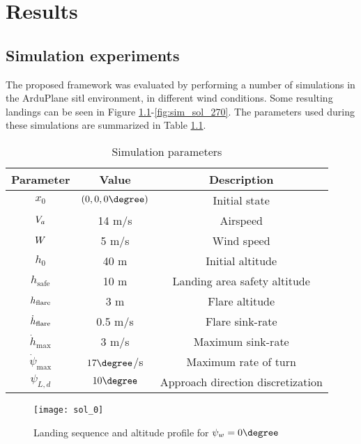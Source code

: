 \chapter{Results}\label{cha:results}
\section{Simulation experiments}
The proposed framework was evaluated by performing a number of simulations in the ArduPlane \ac{sitl} environment, in different wind conditions. 
Some resulting landings can be seen in Figure \ref{fig:sim_sol_0}-\ref{fig:sim_sol_270}. The parameters used during these simulations are summarized in Table \ref{tab:sim_params}.

\begin{table}[H]
    \begin{center}
        \begin{tabular}{|c|c|c|}
            \hline
            \textbf{Parameter} & \textbf{Value} & \textbf{Description}\\
            \hline
            $x_0$ & $(0,0,0\degree)$ & Initial state \\
            \hline
            $V_a$ & 14 m/s & Airspeed \\
            \hline
            $W$ & 5 m/s & Wind speed \\
            \hline
            $h_0$ & 40 m & Initial altitude \\
            \hline
            $h_{\text{safe}}$ & 10 m & Landing area safety altitude \\
            \hline
            $h_{\text{flare}}$ & 3 m & Flare altitude \\
            \hline
            $\dot{h}_{\text{flare}}$ & 0.5 m/s & Flare sink-rate\\
            \hline
            $\dot{h}_{\text{max}}$ & 3 m/s & Maximum sink-rate \\
            \hline
            $\dot{\psi}_{\text{max}}$ & $17\degree$/s & Maximum rate of turn\\
            \hline
            $\psi_{L,d}$ & $10\degree$ & Approach direction discretization \\
            \hline
        \end{tabular}        
    \end{center}
    \caption{Simulation parameters}
    \label{tab:sim_params}
\end{table}

\begin{figure}[H]
    \texttt{[image: sol\_0]}
    \caption{Landing sequence and altitude profile for $\winddir=0\degree$}
    \label{fig:sim_sol_0}
\end{figure}


